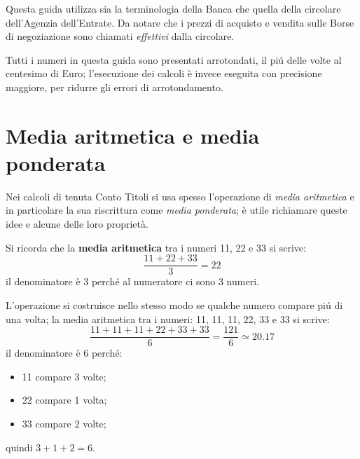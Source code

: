 \documentclass[12pt,a4paper]{article}
\begin{document}
Questa guida  utilizza sia  la terminologia  della Banca  che quella  della circolare
dell'Agenzia dell'Entrate.  Da notare che i  prezzi di acquisto e vendita sulle Borse
di negoziazione sono chiamati \emph{effettivi} dalla circolare.

Tutti i  numeri in questa  guida sono presentati arrotondati,  il piú delle  volte al
centesimo  di  Euro;  l'esecuzione  dei  calcoli è  invece  eseguita  con  precisione
maggiore, per ridurre gli errori di arrotondamento.

\section{Media aritmetica e media ponderata}


Nei  calcoli  di tenuta  Conto  Titoli  si  usa  spesso l'operazione  di  \emph{media
   aritmetica} e  in particolare  la sua riscrittura  come \emph{media  ponderata}; è
utile richiamare queste idee e alcune delle loro proprietà.

Si  ricorda che  la  \textbf{media  aritmetica} tra  i  numeri  \num{11}, \num{22}  e
\num{33} si scrive:
\begin{equation*}
  \frac{\num{11} + \num{22} + \num{33}}{3} = \num{22}
\end{equation*}
il denominatore è \num{3} perché al numeratore ci sono \num{3} numeri.

L'operazione si  costruisce nello stesso  modo se qualche  numero compare piú  di una
volta;  la media  aritmetica tra  i numeri:  \num{11}, \num{11},  \num{11}, \num{22},
\num{33} e \num{33} si scrive:
\begin{equation*}
  \frac{\num{11} + \num{11} + \num{11} + \num{22} + \num{33} + \num{33}}{6}
  = \frac{121}{6} \simeq \num{20,17}
\end{equation*}
il denominatore è \num{6} perché:
\begin{itemize}
\item \num{11} compare \num{3} volte;
\item \num{22} compare \num{1} volta;
\item \num{33} compare \num{2} volte;
\end{itemize}
quindi \(\num{3} + \num{1} + \num{2} = \num{6}\).
\end{document}
